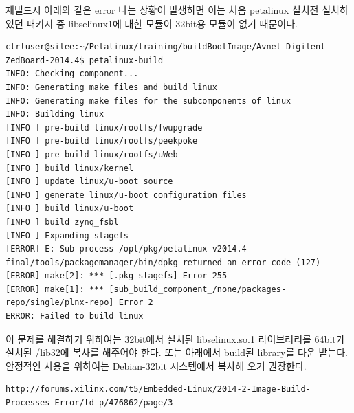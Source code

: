 \documentclass[11pt
  , a4paper
  , article
  , oneside
]{memoir}
\begin{document}
재빌드시 아래와 같은 error 나는 상황이 발생하면 이는 처음 petalinux 설치전 설치하였던 패키지 중 libselinux1에 대한 모듈이 32bit용 모듈이 없기 때문이다.

\begin{lstlisting}[style=termstyle]
ctrluser@silee:~/Petalinux/training/buildBootImage/Avnet-Digilent-ZedBoard-2014.4$ petalinux-build 
INFO: Checking component...
INFO: Generating make files and build linux
INFO: Generating make files for the subcomponents of linux
INFO: Building linux
[INFO ] pre-build linux/rootfs/fwupgrade
[INFO ] pre-build linux/rootfs/peekpoke
[INFO ] pre-build linux/rootfs/uWeb
[INFO ] build linux/kernel
[INFO ] update linux/u-boot source
[INFO ] generate linux/u-boot configuration files
[INFO ] build linux/u-boot
[INFO ] build zynq_fsbl
[INFO ] Expanding stagefs
[ERROR] E: Sub-process /opt/pkg/petalinux-v2014.4-final/tools/packagemanager/bin/dpkg returned an error code (127)
[ERROR] make[2]: *** [.pkg_stagefs] Error 255
[ERROR] make[1]: *** [sub_build_component_/none/packages-repo/single/plnx-repo] Error 2
ERROR: Failed to build linux
\end{lstlisting}

이 문제를 해결하기 위하여는 32bit에서 설치된 libselinux.so.1 라이브러리를 64bit가 설치된 /lib32에 복사를 해주어야 한다.
또는 아래에서 build된 library를 다운 받는다. 안정적인 사용을 위하여는 Debian-32bit 시스템에서 복사해 오기 권장한다.

\begin{lstlisting}[style=termstyle]
http://forums.xilinx.com/t5/Embedded-Linux/2014-2-Image-Build-Processes-Error/td-p/476862/page/3
\end{lstlisting}
\end{document}
